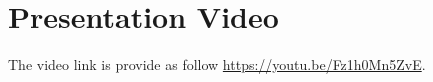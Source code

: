 \documentclass[a4paper,12pt]{article}
\begin{document}
\section{Presentation Video} 
The video link is provide as follow \url{https://youtu.be/Fz1h0Mn5ZvE}.






\end{document}
